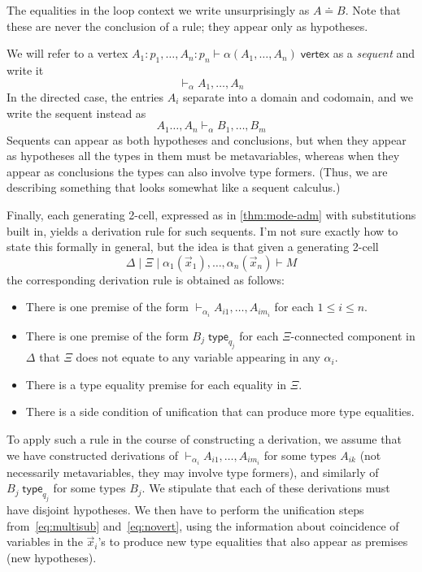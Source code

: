 \documentclass{article}
\theoremstyle{definition}
\theoremstyle{remark}
\def\vertex{\;\mathsf{vertex}}
\def\type{\;\mathsf{type}}
\let\types\vdash
\begin{document}
The equalities in the loop context we write unsurprisingly as $A\doteq B$.
Note that these are never the conclusion of a rule; they appear only as hypotheses.

We will refer to a vertex $A_1:p_1, \dots ,A_n:p_n \types \alpha(A_1,\dots,A_n) \vertex$ as a \emph{sequent} and write it
\[ \types_\alpha A_1,\dots,A_n \]
In the directed case, the entries $A_i$ separate into a domain and codomain, and we write the sequent instead as
\[ A_1\dots,A_n \types_\alpha B_1,\dots,B_m\]
Sequents can appear as both hypotheses and conclusions, but when they appear as hypotheses all the types in them must be metavariables, whereas when they appear as conclusions the types can also involve type formers.
(Thus, we are describing something that looks somewhat like a sequent calculus.)

Finally, each generating 2-cell, expressed as in \cref{thm:mode-adm} with substitutions built in, yields a derivation rule for such sequents.
I'm not sure exactly how to state this formally in general, but the idea is that given a generating 2-cell
\[ \Delta \mid \Xi \mid \alpha_1(\vec x_1),\dots, \alpha_n(\vec x_n) \types M \]
the corresponding derivation rule is obtained as follows:
\begin{itemize}
\item There is one premise of the form $\types_{\alpha_i} A_{i1},\dots,A_{i m_i}$ for each $1\le i\le n$.
\item There is one premise of the form $B_j\type_{q_j}$ for each $\Xi$-connected component in $\Delta$ that $\Xi$ does not equate to any variable appearing in any $\alpha_i$.
\item There is a type equality premise for each equality in $\Xi$.
\item There is a side condition of unification that can produce more type equalities.
\end{itemize}
To apply such a rule in the course of constructing a derivation, we assume that we have constructed derivations of $\types_{\alpha_i} A_{i1},\dots,A_{i m_i}$ for some types $A_{i k}$ (not necessarily metavariables, they may involve type formers), and similarly of $B_j \type_{q_j}$ for some types $B_j$.
We stipulate that each of these derivations must have disjoint hypotheses.
We then have to perform the unification steps from~\eqref{eq:multisub} and~\eqref{eq:novert}, using the information about coincidence of variables in the $\vec x_i$'s to produce new type equalities that also appear as premises (new hypotheses).
\end{document}
